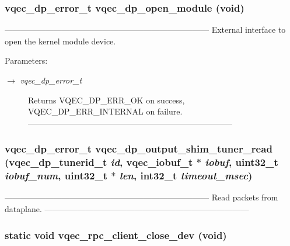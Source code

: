 \subsubsection{\setlength{\rightskip}{0pt plus 5cm}vqec\_\-dp\_\-error\_\-t vqec\_\-dp\_\-open\_\-module (void)}\label{vqec__rpc__client_8c_1366f902c45e78511fcc02654dfbde43}


--------------------------------------------------------------------------- External interface to open the kernel module device.

\begin{Desc}
\item[Parameters:]
\begin{description}
\item[\mbox{$\rightarrow$} {\em vqec\_\-dp\_\-error\_\-t}]Returns VQEC\_\-DP\_\-ERR\_\-OK on success, VQEC\_\-DP\_\-ERR\_\-INTERNAL on failure. --------------------------------------------------------------------------- \end{description}
\end{Desc}
\subsubsection{\setlength{\rightskip}{0pt plus 5cm}vqec\_\-dp\_\-error\_\-t vqec\_\-dp\_\-output\_\-shim\_\-tuner\_\-read (vqec\_\-dp\_\-tunerid\_\-t {\em id}, vqec\_\-iobuf\_\-t $\ast$ {\em iobuf}, uint32\_\-t {\em iobuf\_\-num}, uint32\_\-t $\ast$ {\em len}, int32\_\-t {\em timeout\_\-msec})}\label{vqec__rpc__client_8c_e6f0e6402e9fbea8406123e9b7bff613}


--------------------------------------------------------------------------- Read packets from dataplane. --------------------------------------------------------------------------- 
\subsubsection{\setlength{\rightskip}{0pt plus 5cm}static void vqec\_\-rpc\_\-client\_\-close\_\-dev (void)\hspace{0.3cm}{\tt  [static]}}\label{vqec__rpc__client_8c_362a1e04aa592c186a3bfee24c93d687}


